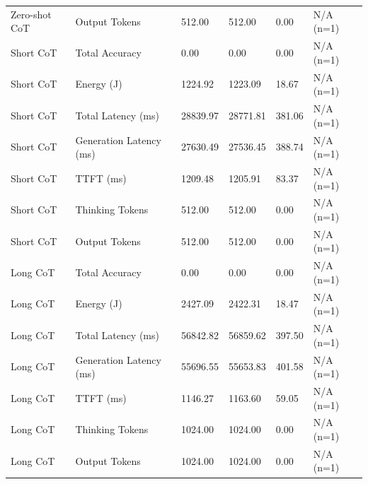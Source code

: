 \begin{table}
\begin{tabular}{llllll}
Zero-shot CoT & Output Tokens & 512.00 & 512.00 & 0.00 & N/A (n=1) \\
Short CoT & Total Accuracy & 0.00 & 0.00 & 0.00 & N/A (n=1) \\
Short CoT & Energy (J) & 1224.92 & 1223.09 & 18.67 & N/A (n=1) \\
Short CoT & Total Latency (ms) & 28839.97 & 28771.81 & 381.06 & N/A (n=1) \\
Short CoT & Generation Latency (ms) & 27630.49 & 27536.45 & 388.74 & N/A (n=1) \\
Short CoT & TTFT (ms) & 1209.48 & 1205.91 & 83.37 & N/A (n=1) \\
Short CoT & Thinking Tokens & 512.00 & 512.00 & 0.00 & N/A (n=1) \\
Short CoT & Output Tokens & 512.00 & 512.00 & 0.00 & N/A (n=1) \\
Long CoT & Total Accuracy & 0.00 & 0.00 & 0.00 & N/A (n=1) \\
Long CoT & Energy (J) & 2427.09 & 2422.31 & 18.47 & N/A (n=1) \\
Long CoT & Total Latency (ms) & 56842.82 & 56859.62 & 397.50 & N/A (n=1) \\
Long CoT & Generation Latency (ms) & 55696.55 & 55653.83 & 401.58 & N/A (n=1) \\
Long CoT & TTFT (ms) & 1146.27 & 1163.60 & 59.05 & N/A (n=1) \\
Long CoT & Thinking Tokens & 1024.00 & 1024.00 & 0.00 & N/A (n=1) \\
Long CoT & Output Tokens & 1024.00 & 1024.00 & 0.00 & N/A (n=1) \\
\bottomrule
\end{tabular}
\end{table}
